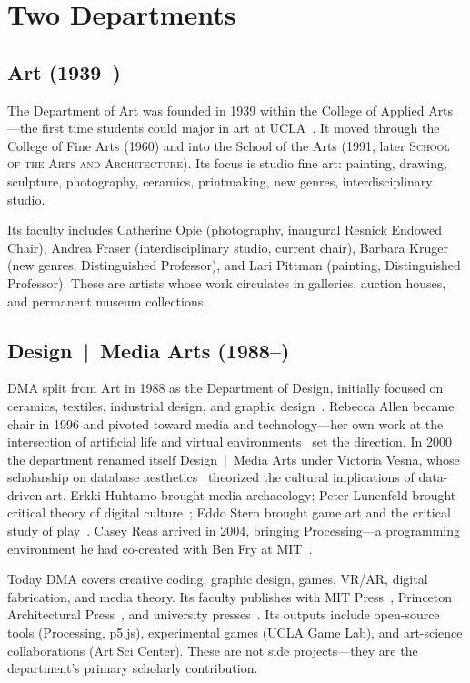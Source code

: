 \documentclass[10pt,letterpaper,twocolumn]{article}
\newcommand{\dma}{\textsc{DMA}}
\newcommand{\sofa}{\textsc{School of the Arts and Architecture}}
\begin{document}
\section{Two Departments}

\subsection{Art (1939--)}

The Department of Art was founded in 1939 within the College of Applied Arts---the first time students could major in art at UCLA~\citep{uclaarts2025about}. It moved through the College of Fine Arts (1960) and into the School of the Arts (1991, later \sofa{}). Its focus is studio fine art: painting, drawing, sculpture, photography, ceramics, printmaking, new genres, interdisciplinary studio.

Its faculty includes Catherine Opie (photography, inaugural Resnick Endowed Chair), Andrea Fraser (interdisciplinary studio, current chair), Barbara Kruger (new genres, Distinguished Professor), and Lari Pittman (painting, Distinguished Professor). These are artists whose work circulates in galleries, auction houses, and permanent museum collections.

\subsection{Design~|~Media Arts (1988--)}

\dma{} split from Art in 1988 as the Department of Design, initially focused on ceramics, textiles, industrial design, and graphic design~\citep{dmahistory}. Rebecca Allen became chair in 1996 and pivoted toward media and technology---her own work at the intersection of artificial life and virtual environments~\citep{allen2005emergence} set the direction. In 2000 the department renamed itself Design~|~Media Arts under Victoria Vesna, whose scholarship on database aesthetics~\citep{vesna2000database, vesna2007database} theorized the cultural implications of data-driven art. Erkki Huhtamo brought media archaeology; Peter Lunenfeld brought critical theory of digital culture~\citep{lunenfeld2011secretwar}; Eddo Stern brought game art and the critical study of play~\citep{stern2002medieval, stern2017howtoplay}. Casey Reas arrived in 2004, bringing Processing---a programming environment he had co-created with Ben Fry at MIT~\citep{reas2006processing, reas2001thesis}.

Today \dma{} covers creative coding, graphic design, games, VR/AR, digital fabrication, and media theory. Its faculty publishes with MIT Press~\citep{reas2014processing, lunenfeld2011secretwar}, Princeton Architectural Press~\citep{reas2010formcode}, and university presses~\citep{vesna2007database}. Its outputs include open-source tools (Processing, p5.js), experimental games (UCLA Game Lab), and art-science collaborations (Art|Sci Center). These are not side projects---they are the department's primary scholarly contribution.
\end{document}

